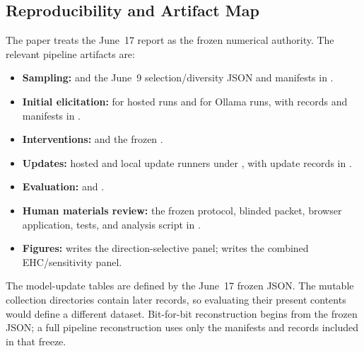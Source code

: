 \subsection{Reproducibility and Artifact Map}
\label{app:fig-code}

The paper treats the June~17 report as the frozen numerical authority.  The relevant
pipeline artifacts are:

\begin{itemize}
  \item \textbf{Sampling:}
         and the June~9
        selection/diversity JSON and manifests in
        .
  \item \textbf{Initial elicitation:}
         for hosted runs and
         for Ollama runs, with
        records and manifests in .
  \item \textbf{Interventions:}
         and the frozen
        .
  \item \textbf{Updates:}
        hosted and local update runners under , with
        update records in .
  \item \textbf{Evaluation:}
         and
        .
  \item \textbf{Human materials review:}
        the frozen protocol, blinded packet, browser application, tests, and
        analysis script in
        .
  \item \textbf{Figures:}
         writes the direction-selective panel;
         writes the combined
        EHC/sensitivity panel.
\end{itemize}

The model-update tables are defined by the June~17 frozen JSON. The mutable collection
directories contain later records, so evaluating their present contents would
define a different dataset. Bit-for-bit reconstruction begins from the frozen
JSON; a full pipeline reconstruction uses only the manifests and records included
in that freeze.

\clearpage
